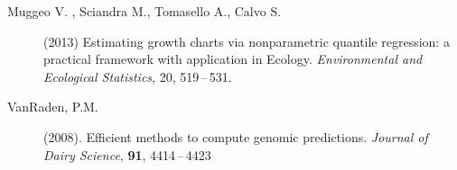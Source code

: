 \documentclass[twoside]{report}
\begin{document}
\begin{description}
\item [Muggeo V. , Sciandra M., Tomasello A., Calvo S.] (2013) Estimating growth charts via 		
		nonparametric quantile regression: a practical framework with application in Ecology. 
		{\it Environmental and Ecological Statistics}, 20, 519\,--\,531. 		
\item[VanRaden, P.M.] (2008).
		Efficient methods to compute genomic predictions.
		{\it Journal of Dairy Science}, {\bf 91}, 4414\,--\,4423
\end{description}
\end{document}
